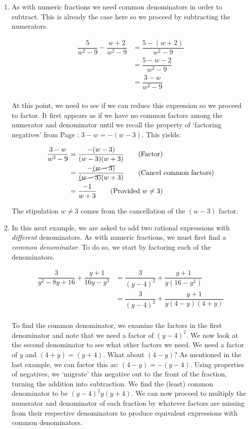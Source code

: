 \begin{ex}
\begin{enumerate}
\item  As with numeric fractions we need common denominators in order to subtract.  This is already the case here so we proceed by subtracting the numerators.

\begin{align*}
\dfrac{5}{w^2 - 9} - \dfrac{w+2}{w^2-9} & = \dfrac{5 - (w+2)}{w^2 - 9}\tag{Subtract fractions}\\ 
& = \dfrac{5 - w - 2}{w^2-9} \tag{Distribute} \\ 
& = \dfrac{3-w}{w^2-9} \tag{Combine like terms} \\
\end{align*}

At this point, we need to see if we can reduce this expression so we proceed to factor.  It first appears as if we have no common factors among the numerator and denominator until we recall the property of `factoring negatives' from Page \pageref{box:propertiesofnegatives}:  $3-w = -(w-3)$. This yields:

\begin{align*}
\dfrac{3-w}{w^2-9} & = \dfrac{-(w-3)}{(w-3)(w+3)} \tag{Factor} \\ 
& = \dfrac{-\cancel{(w-3)}}{\cancel{(w-3)}(w+3)} \tag{Cancel common factors} \\ 
& = \dfrac{-1}{w+3} \tag{Provided $w \neq 3$} \\ 
\end{align*}

The stipulation $w \neq 3$ comes from the cancellation of the $(w-3)$ factor.

\item  	In this next example, we are asked to add two rational expressions with \textit{different} denominators.  As with numeric fractions, we must first find a \textit{common denominator}. To do so, we start by factoring each of the denominators.

\begin{align*}
\dfrac{3}{y^2 - 8y + 16} + \dfrac{y+1}{16y - y^3} & = \dfrac{3}{(y-4)^2} + \dfrac{y+1}{y(16 - y^2)} \tag{Factor} \\			
& = \dfrac{3}{(y-4)^2} + \dfrac{y+1}{y(4-y)(4+y)} \tag{Factor some more} \\
\end{align*}

To find the common denominator, we examine the factors in the first denominator and note that we need a factor of $(y-4)^2$.  We now look at the second denominator to see what other factors we need. We need a factor of $y$ and $(4+y) = (y+4)$.  What about $(4-y)$?  As mentioned in the last example, we can factor this as: $(4-y) = -(y-4)$. Using properties of negatives, we `migrate' this negative out to the front of the fraction, turning the addition into subtraction.  We find the (least) common denominator to be $(y-4)^2 y (y+4)$.  We can now proceed to multiply the numerator and denominator of each fraction by whatever factors are missing from their respective denominators to produce equivalent expressions with common denominators.


\end{enumerate}
\end{ex}

